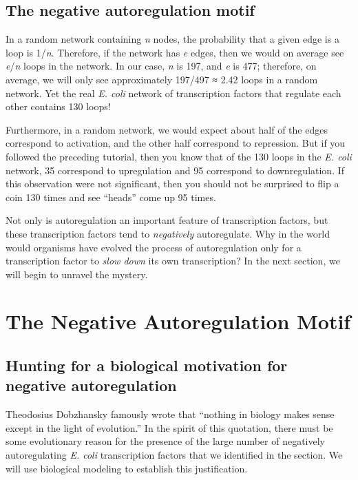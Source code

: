 \FloatBarrier
{}
\subsection{The negative autoregulation motif}

In a random network containing \textit{n} nodes, the probability that a given edge is a loop is 1/\textit{n}. Therefore, if the network has \textit{e} edges, then we would on average see \textit{e}/\textit{n} loops in the network. In our case, \textit{n} is 197, and \textit{e} is 477; therefore, on average, we will only see approximately 197/497 ≈ 2.42 loops in a random network. Yet the real \textit{E. coli} network of transcription factors that regulate each other contains 130 loops!

Furthermore, in a random network, we would expect about half of the edges correspond to activation, and the other half correspond to repression. But if you followed the preceding tutorial, then you know that of the 130 loops in the \textit{E. coli} network, 35 correspond to upregulation and 95 correspond to downregulation. If this observation were not significant, then you should not be surprised to flip a coin 130 times and see ``heads'' come up 95 times.

Not only is autoregulation an important feature of transcription factors, but these transcription factors tend to \textit{negatively} autoregulate. Why in the world would organisms have evolved the process of autoregulation only for a transcription factor to \textit{slow down} its own transcription? In the next section, we will begin to unravel the mystery.


\FloatBarrier
{}

\section{The Negative Autoregulation Motif}
\label{sec:the_negative_autoregulation_motif}

\subsection{Hunting for a biological motivation for negative autoregulation}

Theodosius Dobzhansky famously wrote that ``nothing in biology makes sense except in the light of evolution.'' In the spirit of this quotation, there must be some evolutionary reason for the presence of the large number of negatively autoregulating \textit{E. coli} transcription factors that we identified in the section. We will use biological modeling to establish this justification.

